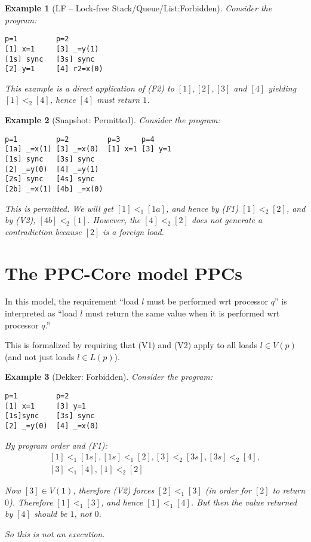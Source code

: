 \documentclass[10pt]{article}
\newtheorem{example}{Example}[section]
\begin{document}
\begin{example}[LF -- Lock-free Stack/Queue/List:Forbidden]
Consider the program:
\begin{verbatim}
p=1         p=2         
[1] x=1     [3] _=y(1)
[1s] sync   [3s] sync
[2] y=1     [4] r2=x(0)
\end{verbatim}

This example is a direct application of (F2) to $[1],[2],[3]$ and
$[4]$ yielding $[1] <_2 [4]$, hence $[4]$ must return $1$.
  
\end{example}
\begin{example}[Snapshot: Permitted]
Consider the program:
\begin{verbatim}
p=1         p=2         p=3     p=4
[1a] _=x(1) [3] _=x(0)  [1] x=1 [3] y=1
[1s] sync   [3s] sync
[2] _=y(0)  [4] _=y(1)
[2s] sync   [4s] sync
[2b] _=x(1) [4b] _=x(0)
\end{verbatim}

This is permitted. We will get $[1] <_1 [1a]$, and hence by (F1) $[1]
<_2 [2]$, and by (V2), $[4b] <_2 [1]$. However, the $[4] <_2 [2]$ does
not generate a contradiction because $[2]$ is a foreign load.

\end{example}


\section{The PPC-Core model PPCs}\label{sec:remote-is-local}

In this model, the requirement ``load $l$ must be performed wrt
processor $q$'' is interpreted as ``load $l$ must return the same
value when it is performed wrt processor $q$.''

This is formalized by requiring that (V1) and (V2) apply to all loads
$l \in V(p)$ (and not just loads $l\in L(p)$).

\begin{example}[Dekker: Forbidden]
Consider the program:
\begin{verbatim}
p=1         p=2         
[1] x=1     [3] y=1
[1s]sync    [3s] sync
[2] _=y(0)  [4] _=x(0)
\end{verbatim}

By program order and (F1):
$$ 
\begin{array}{l}
[1] <_1 [1s], [1s] <_1 [2], [3] <_2 [3s], [3s] <_2 [4],\\{}
[3] <_1 [4], [1] <_2 [2]  
\end{array}
$$

Now $[3]\in V(1)$, therefore (V2) forces $[2] <_1 [3]$ (in order for
$[2]$ to return $0$). Therefore $[1] <_1 [3]$, and hence 
$[1] <_1 [4]$. But then the value returned by $[4]$ should be $1$, not $0$. 

So this is not an execution. 
\end{example}
\end{document}
